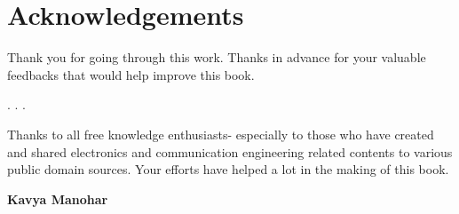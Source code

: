 \chapter*{Acknowledgements}

Thank you for going through this work. Thanks in advance for your valuable feedbacks that would help improve this book.

.
.
.

Thanks to all free knowledge enthusiasts- especially to those who have created and shared electronics and communication engineering related contents to various public domain sources. Your efforts have helped a lot in the making of this book.

\begin{flushright}
\textbf{Kavya Manohar}
\end{flushright}

